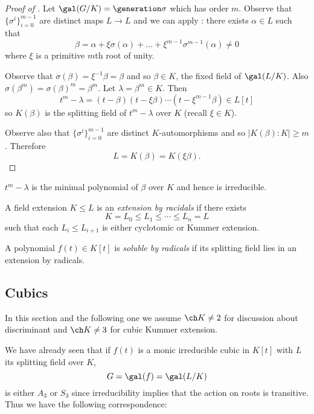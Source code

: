 \documentclass[a4paper]{article}
\begin{document}
\begin{proof}[Proof of ]
  \label{proof:kummer theory}
  Let \(\gal(G/K) = \generation \sigma\) which has order \(m\). Observe that \(\{\sigma^i\}_{i = 0}^{m - 1}\) are distinct maps \(L \to L\) and we can apply : there exists \(\alpha \in L\) such that
  \[
    \beta = \alpha + \xi \sigma(\alpha) + \dots + \xi^{m - 1} \sigma^{m - 1}(\alpha) \neq 0
  \]
  where \(\xi\) is a primitive \(m\)th root of unity.

  Observe that \(\sigma(\beta) = \xi^{-1} \beta = \beta\) and so \(\beta \in K\), the fixed field of \(\gal(L/K)\). Also \(\sigma(\beta^m) = \sigma(\beta)^m = \beta^m\). Let \(\lambda = \beta^m \in K\). Then
  \[
    t^m - \lambda = (t - \beta)(t - \xi\beta)\cdots(t - \xi^{m - 1}\beta) \in L[t]
  \]
  so \(K(\beta)\) is the splitting field of \(t^m - \lambda\) over \(K\) (recall \(\xi \in K\)).

  Observe also that \(\{\sigma^i\}_{i = 0}^{m - 1}\) are distinct \(K\)-automorphisms and so \(|K(\beta):K| \geq m\). Therefore
  \[
    L = K(\beta) = K(\xi\beta).
  \]
\end{proof}

\(t^m - \lambda\) is the minimal polynomial of \(\beta\) over \(K\) and hence is irreducible.

\begin{definition}
  A field extension \(K \leq L\) is an \emph{extension by racidals} if there exists
  \[
    K = L_0 \leq L_ 1 \leq \cdots \leq L_n = L
  \]
  such that each \(L_i \leq L_{i + 1}\) is either cyclotomic or Kummer extension.
\end{definition}

\begin{definition}
  A polynomial \(f(t) \in K[t]\) is \emph{soluble by radicals} if its splitting field lies in an extension by radicals.
\end{definition}

\subsection{Cubics}

In this section and the following one we assume \(\ch K \neq 2\) for discussion about discriminant and \(\ch K \neq 3\) for cubic Kummer extension.

We have already seen that if \(f(t)\) is a monic irreducible cubic in \(K[t]\) with \(L\) its splitting field over \(K\),
\[
  G = \gal(f) = \gal(L/K)
\]
is either \(A_3\) or \(S_3\) since irreducibility implies that the action on roots is transitive. Thus we have the following correspondence:
\end{document}
